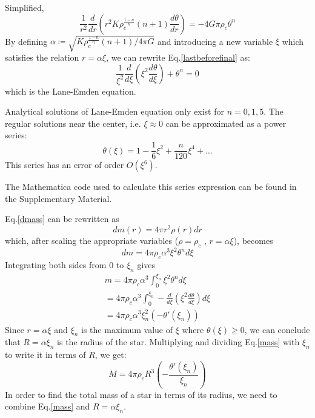 \documentclass[a4paper]{article}
\begin{document}
\begin{enumerate}[label=(\alph*)]
    Simplified,
    \begin{equation}
        \frac{1}{r^{2}}\frac{d}{dr}\left(r^{2}K\rho_{c}^{\frac{1-n}{n}}(n+1)\frac{d\theta}{dr}\right) = -4G\pi \rho_{c}\theta^{n} \label{lastbeforefinal}
    \end{equation}
     By defining $\alpha \coloneqq \sqrt{K\rho_{c}^{\frac{1-n}{n}}(n+1)/4\pi G}$ and introducing a new variable $\xi$ which satisfies the relation $r = \alpha\xi$, we can rewrite Eq.\eqref{lastbeforefinal} as:
    \begin{equation}
        \frac{1}{\xi^{2}}\frac{d}{d\xi} \left(\xi^{2}\frac{d\theta}{d\xi}\right) + \theta^{n} = 0 \label{laneemden}
    \end{equation}
    which is the Lane-Emden equation.
    
    Analytical solutions of Lane-Emden equation only exist for $n=0,1,5$. The regular solutions near the center, i.e. $\xi\approx 0$ can be approximated as a power series:
    \begin{equation}
        \theta(\xi) = 1 - \frac{1}{6}\xi^{2} + \frac{n}{120}\xi^{4} + \dots
    \end{equation}
    This series has an error of order $O(\xi^{6})$.
    
    The Mathematica code used to calculate this series expression can be found in the Supplementary Material.
    
    Eq.\eqref{dmass} can be rewritten as
    \begin{equation}
        dm(r) = 4\pi r^{2}\rho(r)dr \label{dmassnew}
    \end{equation}
    which, after scaling the appropriate variables ($\rho = \rho_{c}$ , $r = \alpha\xi$), becomes
    \begin{equation}
        dm = 4\pi \rho_{c} \alpha^{3}\xi^{2} \theta^{n}d\xi 
    \end{equation}
    Integrating both sides from $0$ to $\xi_{n}$ gives
    \begin{align}
        m = 4\pi \rho_{c} \alpha^{3} \int_{0}^{\xi_{n}} \xi^{2} \theta^{n}d\xi \nonumber \\
          = 4\pi \rho_{c} \alpha^{3} \int_{0}^{\xi_{n}} -\frac{d}{d\xi} \left(\xi^{2}\frac{d\theta}{d\xi}\right) d\xi \nonumber \\
        = 4\pi \rho_{c} \alpha^{3}\xi_{n}^{2} \left(-\theta '(\xi_{n}) \right) \label{mass}
    \end{align}
    Since $r = \alpha\xi$ and $\xi_{n}$ is the maximum value of $\xi$ where $\theta(\xi) \geq 0$, we can conclude that $R = \alpha\xi_{n}$ is the radius of the star. Multiplying and dividing Eq.\eqref{mass} with $\xi_{n}$ to write it in terms of $R$, we get:
    \begin{equation}
        M = 4\pi \rho_{c} R^{3} \left(-\frac{\theta '(\xi_{n})}{\xi_{n}} \right)
    \end{equation}
    In order to find the total mass of a star in terms of its radius, we need to combine Eq.\eqref{mass} and $R = \alpha\xi_{n}$.
    

\end{enumerate}
\end{document}
